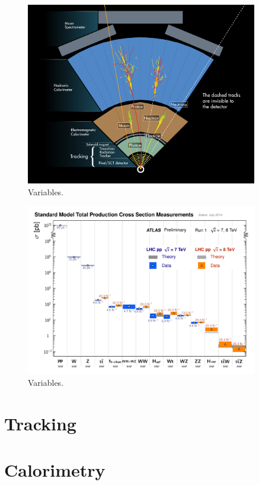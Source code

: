 \begin{figure}[tp]
  \centering
  \includegraphics[width=0.90\textwidth]{figures/lhc-atlas/atlas-wedge-1301009_01.jpg}
  \caption{Variables.}
  \label{fig:atlas-wedge}
\end{figure}

\begin{figure}[tp]
  \centering
  \includegraphics[width=0.90\textwidth]{figures/lhc-atlas/ATLAS_a_SMSummary_TotalXsect}
  \caption{Variables.}
  \label{fig:atlas-measurements}
\end{figure}

\section{Tracking}
\section{Calorimetry}
